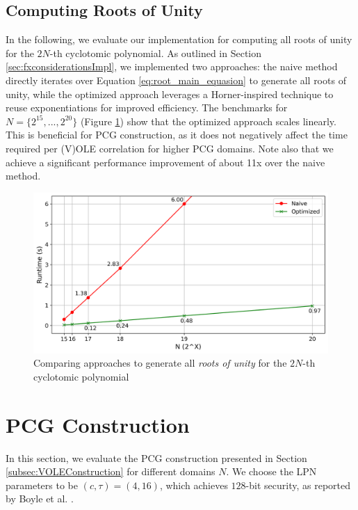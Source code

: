 \subsection{Computing Roots of Unity}
\label{subsec:evalRootOfUnity}
In the following, we evaluate our implementation for computing all roots of unity for the $2N$-th cyclotomic polynomial. As outlined in Section \ref{sec:fxconsiderationsImpl}, we implemented two approaches: the naive method directly iterates over Equation \ref{eq:root_main_equasion} to generate all roots of unity, while the optimized approach leverages a Horner-inspired technique to reuse exponentiations for improved efficiency. The benchmarks for $N=\{2^{15}, ..., 2^{20}\}$ (Figure \ref{fig:ComparingRootOfUnityAp}) show that the optimized approach scales linearly. This is beneficial for PCG construction, as it does not negatively affect the time required per (V)OLE correlation for higher PCG domains. Note also that we achieve a significant performance improvement of about 11x over the naive method.

\begin{figure}[t]
    \centering
    \includegraphics[scale=0.49]{images/plots/gen_roots.png}
    \caption{Comparing approaches to generate all \textit{roots of unity} for the $2N$-th cyclotomic polynomial}
    \label{fig:ComparingRootOfUnityAp}
\end{figure}


\section{PCG Construction}
In this section, we evaluate the PCG construction presented in Section \ref{subsec:VOLEConstruction} for different domains $N$. We choose the LPN parameters to be $(c,\tau)=(4,16)$, which achieves $128$-bit security, as reported by Boyle et al. \cite{boyle2020efficient}. 

